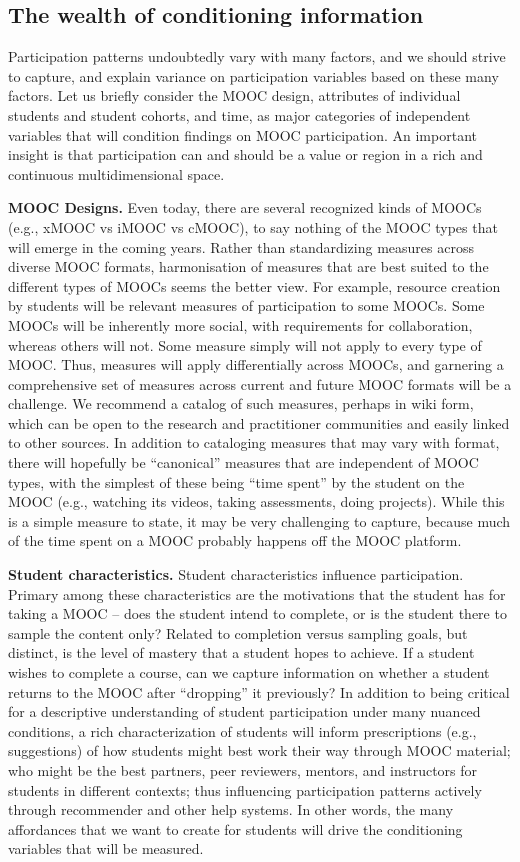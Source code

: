 \subsection{The wealth of conditioning information}

Participation patterns
undoubtedly vary with many factors, and we should strive to capture, and
explain variance on participation variables based on these many
factors. Let us briefly consider the MOOC design, attributes
of individual students and student cohorts, and time, as major
categories of independent variables that will condition findings on MOOC
participation. An important insight is that participation can and should
be a value or region in a rich and continuous multidimensional space.

\textbf{MOOC Designs.} Even today, there are several recognized kinds of MOOCs
(e.g., xMOOC vs iMOOC vs cMOOC), to say nothing of the MOOC types that
will emerge in the coming years.  Rather than standardizing measures
across diverse MOOC formats, harmonisation of measures that are best
suited to the different types of MOOCs seems the better view. For
example, resource creation by students will be relevant measures of
participation to some MOOCs. Some MOOCs will be inherently more social,
with requirements for collaboration, whereas others will not. Some
measure simply will not apply to every type of MOOC. Thus, measures will
apply differentially across MOOCs, and garnering a comprehensive set of
measures across current and future MOOC formats will be a challenge. We
recommend a catalog of such measures, perhaps in wiki form, which can be
open to the research and practitioner communities and easily linked to
other sources.  In addition to cataloging measures that may vary with
format, there will hopefully be ``canonical'' measures that are
independent of MOOC types, with the simplest of these being ``time spent''
by the student on the MOOC (e.g., watching its videos, taking
assessments, doing projects). While this is a simple measure to state,
it may be very challenging to capture, because much of the time spent on
a MOOC probably happens off the MOOC platform.  

\textbf{Student characteristics.} Student characteristics influence
participation. Primary among these characteristics are the motivations
that the student has for taking a MOOC -- does the student intend to
complete, or is the student there to sample the content only? Related to
completion versus sampling goals, but distinct, is the level of mastery
that a student hopes to achieve. If a student wishes to complete a
course, can we capture information on whether a student returns to the
MOOC after ``dropping'' it previously?  In addition to being critical for
a descriptive understanding of student participation under many nuanced
conditions, a rich characterization of students will inform
prescriptions (e.g., suggestions) of how students might best work their
way through MOOC material; who might be the best partners, peer
reviewers, mentors, and instructors for students in different contexts;
thus influencing participation patterns actively through recommender and
other help systems. In other words, the many affordances that we want to
create for students will drive the conditioning variables that will be
measured.  

